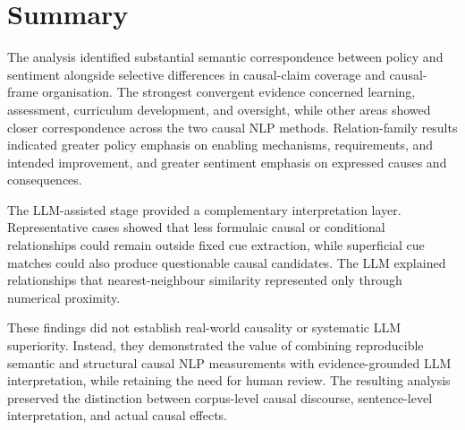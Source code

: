 \section*{Summary}

The analysis identified substantial semantic correspondence between policy and
sentiment alongside selective differences in causal-claim coverage and causal-frame
organisation. The strongest convergent evidence concerned learning, assessment,
curriculum development, and oversight, while other areas showed closer correspondence
across the two causal NLP methods. Relation-family results indicated greater policy
emphasis on enabling mechanisms, requirements, and intended improvement, and greater
sentiment emphasis on expressed causes and consequences.

The LLM-assisted stage provided a complementary interpretation layer. Representative
cases showed that less formulaic causal or conditional relationships could remain
outside fixed cue extraction, while superficial cue matches could also produce
questionable causal candidates. The LLM explained relationships that
nearest-neighbour similarity represented only through numerical proximity.

These findings did not establish real-world causality or systematic LLM superiority.
Instead, they demonstrated the value of combining reproducible semantic and
structural causal NLP measurements with evidence-grounded LLM interpretation, while
retaining the need for human review. The resulting analysis preserved the distinction
between corpus-level causal discourse, sentence-level interpretation, and actual
causal effects.